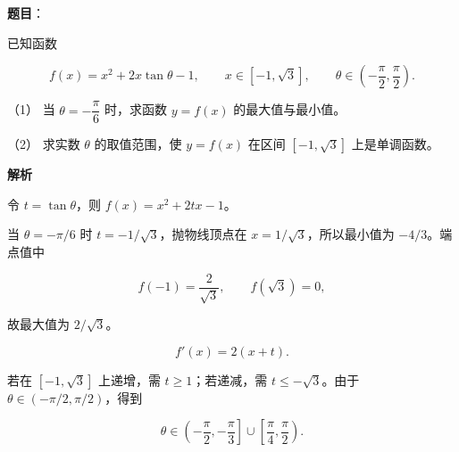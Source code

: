 \begin{answer}

\textbf{题目}：

已知函数

\nopagebreak[4]
\[
f(x)=x^2+2x\tan\theta-1,\qquad x\in[-1,\sqrt3],
\qquad\theta\in\left(-\frac\pi2,\frac\pi2\right).
\]

（1） 当 $\theta=-\dfrac\pi6$ 时，求函数 $y=f(x)$ 的最大值与最小值。

（2） 求实数 $\theta$ 的取值范围，使 $y=f(x)$ 在区间 $[-1,\sqrt3]$ 上是单调函数。

\textbf{解析}

令 $t=\tan\theta$，则 $f(x)=x^2+2tx-1$。


当 $\theta=-\pi/6$ 时 $t=-1/\sqrt3$，抛物线顶点在 $x=1/\sqrt3$，所以最小值为 $-4/3$。端点值中

\nopagebreak[4]
\[
f(-1)=\frac2{\sqrt3},\qquad f(\sqrt3)=0,
\]

故最大值为 $2/\sqrt3$。


\nopagebreak[4]
\[
f'(x)=2(x+t).
\]

若在 $[-1,\sqrt3]$ 上递增，需 $t\ge1$；若递减，需 $t\le-\sqrt3$。由于 $\theta\in(-\pi/2,\pi/2)$，得到

\nopagebreak[4]
\[
\theta\in\left(-\frac\pi2,-\frac\pi3\right]\cup
\left[\frac\pi4,\frac\pi2\right).
\]


\gkanswer{答案（2）：$\theta\in\left(-\dfrac\pi2,-\dfrac\pi3\right]\cup\left[\dfrac\pi4,\dfrac\pi2\right)$。}

\end{answer}
